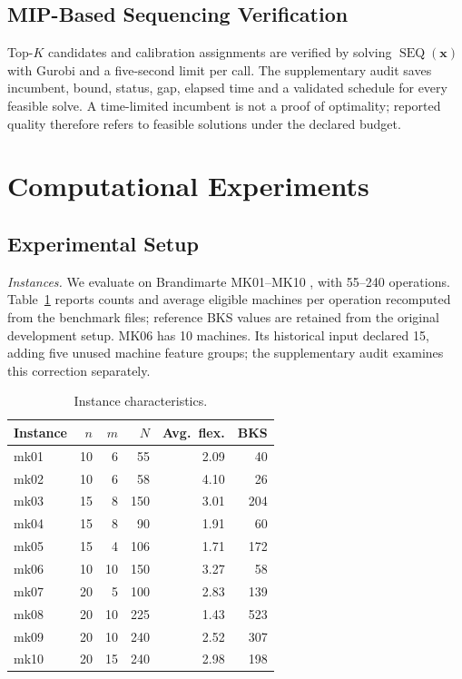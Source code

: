\documentclass[conference]{IEEEtran}
\begin{document}
\subsection{MIP-Based Sequencing Verification}
Top-$K$ candidates and calibration assignments are verified by solving $\operatorname{SEQ}(\mathbf{x})$ with Gurobi and a five-second limit per call. The supplementary audit saves incumbent, bound, status, gap, elapsed time and a validated schedule for every feasible solve. A time-limited incumbent is not a proof of optimality; reported quality therefore refers to feasible solutions under the declared budget.

\section{Computational Experiments}

\subsection{Experimental Setup}
\textit{Instances.} We evaluate on Brandimarte MK01--MK10 \cite{Brandimarte1993}, with 55--240 operations. Table~\ref{tab:instances} reports counts and average eligible machines per operation recomputed from the benchmark files; reference BKS values are retained from the original development setup. MK06 has 10 machines. Its historical input declared 15, adding five unused machine feature groups; the supplementary audit examines this correction separately.

\begin{table}[htbp]\centering\caption{Instance characteristics.}\label{tab:instances}
\begin{tabular}{lrrrrr}\toprule
Instance & $n$ & $m$ & $N$ & Avg.\ flex. & BKS \\ \midrule
mk01 & 10 & 6 & 55 & 2.09 & 40 \\
mk02 & 10 & 6 & 58 & 4.10 & 26 \\
mk03 & 15 & 8 & 150 & 3.01 & 204 \\
mk04 & 15 & 8 & 90 & 1.91 & 60 \\
mk05 & 15 & 4 & 106 & 1.71 & 172 \\
mk06 & 10 & 10 & 150 & 3.27 & 58 \\
mk07 & 20 & 5 & 100 & 2.83 & 139 \\
mk08 & 20 & 10 & 225 & 1.43 & 523 \\
mk09 & 20 & 10 & 240 & 2.52 & 307 \\
mk10 & 20 & 15 & 240 & 2.98 & 198 \\ \bottomrule
\end{tabular}
\end{table}
\end{document}
